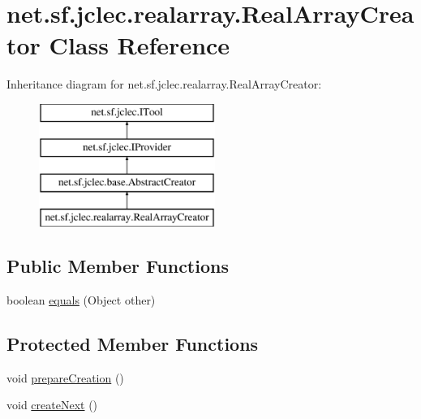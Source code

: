 \hypertarget{classnet_1_1sf_1_1jclec_1_1realarray_1_1_real_array_creator}{\section{net.\-sf.\-jclec.\-realarray.\-Real\-Array\-Creator Class Reference}
\label{classnet_1_1sf_1_1jclec_1_1realarray_1_1_real_array_creator}
}
Inheritance diagram for net.\-sf.\-jclec.\-realarray.\-Real\-Array\-Creator\-:\begin{figure}[H]
\begin{center}
\leavevmode
\includegraphics[height=4.000000cm]{classnet_1_1sf_1_1jclec_1_1realarray_1_1_real_array_creator}
\end{center}
\end{figure}
\subsection*{Public Member Functions}
\begin{DoxyCompactItemize}
\item 
boolean \hyperlink{classnet_1_1sf_1_1jclec_1_1realarray_1_1_real_array_creator_a1be0b67330f4131b07ec5bbc8c1972f2}{equals} (Object other)
\end{DoxyCompactItemize}
\subsection*{Protected Member Functions}
\begin{DoxyCompactItemize}
\item 
void \hyperlink{classnet_1_1sf_1_1jclec_1_1realarray_1_1_real_array_creator_a60cd5c3f11c12bca77893b6b1cb665af}{prepare\-Creation} ()
\item 
void \hyperlink{classnet_1_1sf_1_1jclec_1_1realarray_1_1_real_array_creator_a4c4d021fbc4923f45748f67f66d3b59d}{create\-Next} ()
\end{DoxyCompactItemize}
